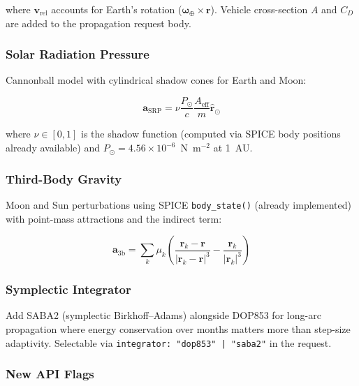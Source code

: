 \documentclass[11pt, a4paper]{article}
\begin{document}
where $\mathbf{v}_\text{rel}$ accounts for Earth's rotation
($\boldsymbol{\omega}_\oplus \times \mathbf{r}$). Vehicle cross-section $A$
and $C_D$ are added to the propagation request body.

\subsubsection{Solar Radiation Pressure}

Cannonball model with cylindrical shadow cones for Earth and Moon:

\begin{equation}
  \mathbf{a}_\text{SRP} = \nu \frac{P_\odot}{c}
    \frac{A_\text{eff}}{m} \hat{\mathbf{r}}_{\odot}
\end{equation}

where $\nu \in [0,1]$ is the shadow function (computed via SPICE body
positions already available) and $P_\odot = 4.56\times10^{-6}$~N~m$^{-2}$
at 1~AU.

\subsubsection{Third-Body Gravity}

Moon and Sun perturbations using SPICE \texttt{body\_state()} (already
implemented) with point-mass attractions and the indirect term:

\begin{equation}
  \mathbf{a}_\text{3b} = \sum_k \mu_k
    \left(\frac{\mathbf{r}_k - \mathbf{r}}{|\mathbf{r}_k - \mathbf{r}|^3}
          - \frac{\mathbf{r}_k}{|\mathbf{r}_k|^3}\right)
\end{equation}

\subsubsection{Symplectic Integrator}

Add SABA2 (symplectic Birkhoff--Adams) alongside DOP853 for long-arc
propagation where energy conservation over months matters more than step-size
adaptivity. Selectable via \texttt{integrator: "dop853" | "saba2"} in the
request.

\subsubsection{New API Flags}
\end{document}
